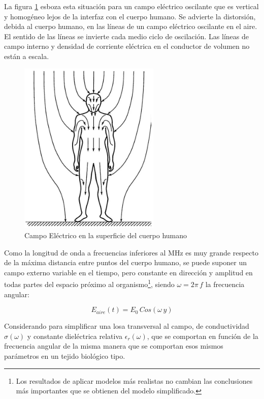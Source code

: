La figura \ref{fig:69} esboza esta situación para un campo eléctrico oscilante que es vertical y homogéneo lejos de la interfaz con el cuerpo humano. Se advierte la distorsión, debida al cuerpo humano, en las líneas de un campo eléctrico oscilante en el aire. El sentido de las líneas se invierte cada medio ciclo de oscilación. Las líneas de campo interno y densidad de corriente eléctrica en el conductor de volumen no están a escala.

\begin{figure}[H]
    \centering
    \includegraphics[width=0.6\textwidth]{./Figures/fig69}
	\caption{Campo Eléctrico en la superficie del cuerpo humano }
	\label{fig:69}
\end{figure}

Como la longitud de onda a frecuencias inferiores al MHz es muy grande respecto de la máxima distancia entre puntos del cuerpo humano, se puede suponer un campo externo variable en el tiempo, pero constante en dirección y amplitud en todas partes del espacio próximo al organismo\footnote{Los resultados de aplicar modelos más realistas \citep{Lin_2012} \citep{Polk_Postow_2006} \citep{Greenebaum_Barnes_2019} no cambian las conclusiones más importantes que se obtienen del modelo simplificado.}, siendo $\omega=2\pi\,f$ la frecuencia angular:

\begin{equation}
	E_{aire}(t)= E_{0}\,Cos(\omega\,y)
\end{equation}

Considerando para simplificar una losa transversal al campo, de conductividad $\sigma(\omega)$ y constante dieléctrica relativa $\epsilon_{r}(\omega)$, que se comportan en función de la frecuencia angular de la misma manera que se comportan esos mismos parámetros en un tejido biológico tipo.

